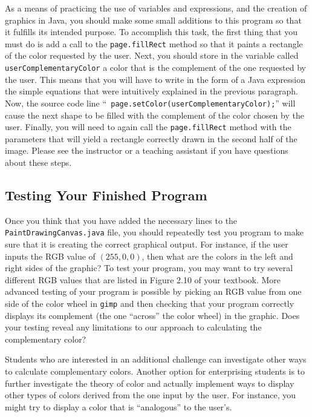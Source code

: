 As a means of practicing the use of variables and expressions, and the creation of graphics in Java, you should make
some small additions to this program so that it fulfills its intended purpose. To accomplish this task, the first thing
that you must do is add a call to the {\tt page.fillRect} method so that it paints a rectangle of the color requested by
the user. Next, you should store in the variable called {\tt userComplementaryColor} a color that is the complement of
the one requested by the user. This means that you will have to write in the form of a Java expression the simple
equations that were intuitively explained in the previous paragraph. Now, the source code line ``{\tt
page.setColor(userComplementaryColor);}'' will cause the next shape to be filled with the complement of the color chosen
by the user. Finally, you will need to again call the {\tt page.fillRect} method with the parameters that will yield a
rectangle correctly drawn in the second half of the image. Please see the instructor or a teaching assistant if you have
questions about these steps.

\vspace*{-.1in}
\subsection*{Testing Your Finished Program}

Once you think that you have added the necessary lines to the {\tt PaintDrawingCanvas.java} file, you should repeatedly
test you program to make sure that it is creating the correct graphical output. For instance, if the user inputs the RGB
value of $(255, 0, 0)$, then what are the colors in the left and right sides of the graphic? To test your program, you
may want to try several different RGB values that are listed in Figure 2.10 of your textbook. More advanced testing of
your program is possible by picking an RGB value from one side of the color wheel in {\tt gimp} and then checking that
your program correctly displays its complement (the one ``across'' the color wheel) in the graphic. Does your testing
reveal any limitations to our approach to calculating the complementary color?

Students who are interested in an additional challenge can investigate other ways to calculate complementary colors.
Another option for enterprising students is to further investigate the theory of color and actually implement ways to
display other types of colors derived from the one input by the user. For instance, you might try to display a color
that is ``analogous'' to the user's.

